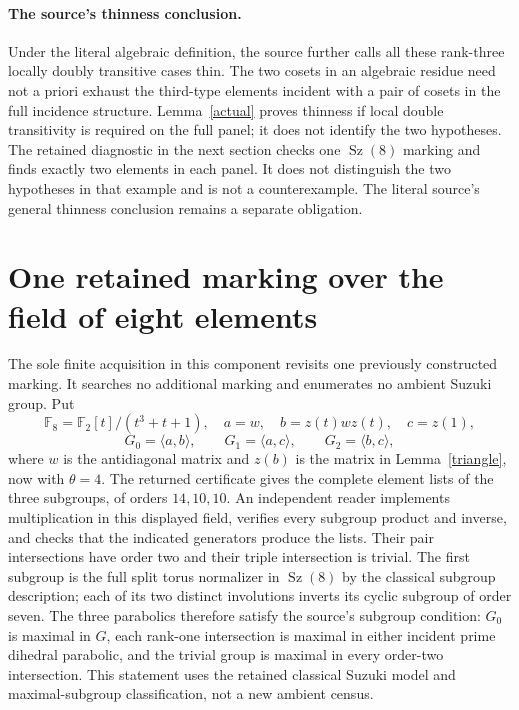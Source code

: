 \documentclass[11pt,a4paper]{article}
\newcommand{\Sz}{\operatorname{Sz}}
\newcommand{\F}{\mathbb F}
\newcommand{\gen}[1]{\langle#1\rangle}
\begin{document}
\paragraph{The source's thinness conclusion.}
Under the literal algebraic definition, the source further calls all
these rank-three locally doubly transitive cases thin. The two cosets
in an algebraic residue need not a priori exhaust the third-type elements
incident with a pair of cosets in the full incidence structure.
Lemma~\ref{actual} proves thinness if local double transitivity is
required on the full panel; it does not identify the two hypotheses.
The retained diagnostic in the next section checks one $\Sz(8)$ marking
and finds exactly two elements in each panel. It does not distinguish
the two hypotheses in that example and is not a counterexample. The
literal source's general thinness conclusion remains a separate obligation.

\section{One retained marking over the field of eight elements}
The sole finite acquisition in this component revisits one previously
constructed marking. It searches no additional marking and enumerates
no ambient Suzuki group. Put
\[
 \F_8=\F_2[t]/(t^3+t+1),\quad
 a=w,\quad b=z(t)wz(t),\quad c=z(1),
\]
\[
 G_0=\gen{a,b},\qquad G_1=\gen{a,c},\qquad G_2=\gen{b,c},
\]
where $w$ is the antidiagonal matrix and $z(b)$ is the matrix in
Lemma~\ref{triangle}, now with $\theta=4$.
The returned certificate gives the complete element lists of the three
subgroups, of orders $14,10,10$. An independent reader implements
multiplication in this displayed field, verifies every subgroup product
and inverse, and checks that the indicated generators produce the lists.
Their pair intersections have order two and their triple intersection
is trivial. The first subgroup is the full split torus normalizer in
$\Sz(8)$ by the classical subgroup description; each of its two distinct
involutions inverts its cyclic subgroup of order seven. The three
parabolics therefore satisfy the source's subgroup condition: $G_0$ is
maximal in $G$, each rank-one intersection is maximal in either incident
prime dihedral parabolic, and the trivial group is maximal in every
order-two intersection. This statement uses the retained classical
Suzuki model and maximal-subgroup classification, not a new ambient census.
\end{document}
